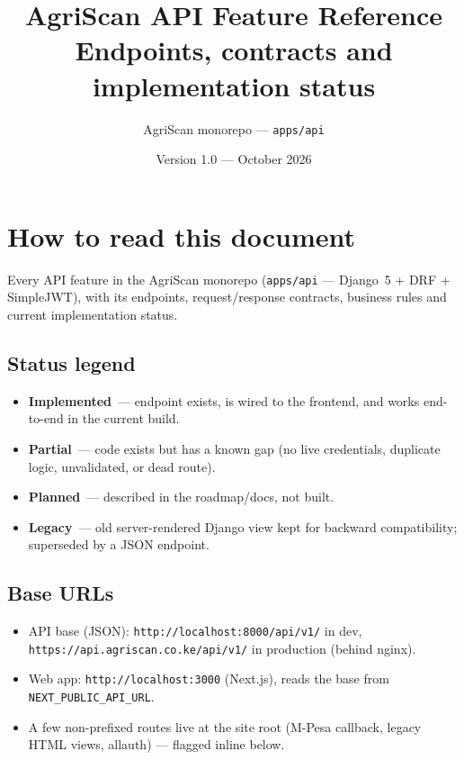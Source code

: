 \documentclass[11pt,a4paper]{article}
\title{\textbf{AgriScan API Feature Reference}\\[4pt]
\large Endpoints, contracts and implementation status}
\author{AgriScan monorepo --- \texttt{apps/api}}
\date{Version 1.0 --- October 2026}
\newcommand{\done}{\textcolor{statusdone}{\textbf{Implemented}}}
\newcommand{\partialstatus}{\textcolor{statuspart}{\textbf{Partial}}}
\newcommand{\planned}{\textcolor{statusplan}{\textbf{Planned}}}
\newcommand{\legacy}{\textcolor{statusplan}{\textbf{Legacy}}}
\newcommand{\code}[1]{\texttt{\allowbreak #1\allowbreak}}
\begin{document}
\maketitle
\tableofcontents
\newpage

\section{How to read this document}

Every API feature in the AgriScan monorepo (\code{apps/api} --- Django~5 +
DRF + SimpleJWT), with its endpoints, request/response contracts, business
rules and current implementation status.

\subsection*{Status legend}
\begin{itemize}
  \item \done\ --- endpoint exists, is wired to the frontend, and works
        end-to-end in the current build.
  \item \partialstatus\ --- code exists but has a known gap (no live
        credentials, duplicate logic, unvalidated, or dead route).
  \item \planned\ --- described in the roadmap/docs, not built.
  \item \legacy\ --- old server-rendered Django view kept for backward
        compatibility; superseded by a JSON endpoint.
\end{itemize}

\subsection*{Base URLs}
\begin{itemize}
  \item API base (JSON): \code{http://localhost:8000/api/v1/} in dev,
        \code{https://api.agriscan.co.ke/api/v1/} in production (behind nginx).
  \item Web app: \code{http://localhost:3000} (Next.js), reads the base from
        \code{NEXT\_PUBLIC\_API\_URL}.
  \item A few non-prefixed routes live at the site root (M-Pesa callback,
        legacy HTML views, allauth) --- flagged inline below.
\end{itemize}

\end{document}
